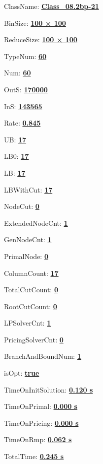 \documentclass[11pt]{article}
\begin{document}
\pagestyle{empty}


ClassName: \underline{\textbf{Class_08.2bp-21}}
\par
BinSize: \underline{\textbf{100 × 100}}
\par
ReduceSize: \underline{\textbf{100 × 100}}
\par
TypeNum: \underline{\textbf{60}}
\par
Num: \underline{\textbf{60}}
\par
OutS: \underline{\textbf{170000}}
\par
InS: \underline{\textbf{143565}}
\par
Rate: \underline{\textbf{0.845}}
\par
UB: \underline{\textbf{17}}
\par
LB0: \underline{\textbf{17}}
\par
LB: \underline{\textbf{17}}
\par
LBWithCut: \underline{\textbf{17}}
\par
NodeCut: \underline{\textbf{0}}
\par
ExtendedNodeCnt: \underline{\textbf{1}}
\par
GenNodeCnt: \underline{\textbf{1}}
\par
PrimalNode: \underline{\textbf{0}}
\par
ColumnCount: \underline{\textbf{17}}
\par
TotalCutCount: \underline{\textbf{0}}
\par
RootCutCount: \underline{\textbf{0}}
\par
LPSolverCnt: \underline{\textbf{1}}
\par
PricingSolverCnt: \underline{\textbf{0}}
\par
BranchAndBoundNum: \underline{\textbf{1}}
\par
isOpt: \underline{\textbf{true}}
\par
TimeOnInitSolution: \underline{\textbf{0.120 s}}
\par
TimeOnPrimal: \underline{\textbf{0.000 s}}
\par
TimeOnPricing: \underline{\textbf{0.000 s}}
\par
TimeOnRmp: \underline{\textbf{0.062 s}}
\par
TotalTime: \underline{\textbf{0.245 s}}
\par
\newpage


\end{document}
